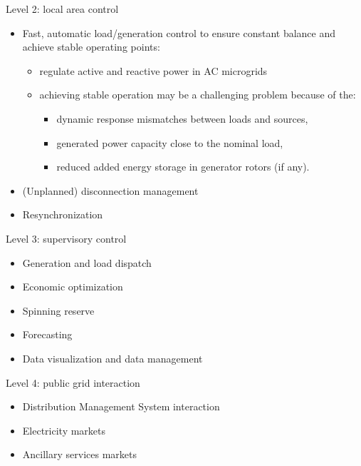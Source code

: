 \begin{frame}{Level 2: local area control}
\begin{itemize}
\item Fast, automatic load/generation control to ensure constant balance and
  achieve stable operating points:
  \begin{itemize}
  \item regulate active and reactive power in AC microgrids
  \item achieving stable operation may be a challenging problem because of the:
    \begin{itemize}
    \item dynamic response mismatches between loads and sources,
    \item generated power capacity close to the nominal load,
    \item reduced added energy storage in generator rotors (if any).
    \end{itemize}
  \end{itemize}
\item (Unplanned) disconnection management
\item Resynchronization
\end{itemize}
\end{frame}

\begin{frame}{Level 3: supervisory control}
\begin{itemize}
\item Generation and load dispatch
\item Economic optimization
\item Spinning reserve
\item Forecasting
\item Data visualization and data management
\end{itemize}
\end{frame}

\begin{frame}{Level 4: public grid interaction}

\begin{itemize}
\item Distribution Management System interaction
\item Electricity markets
\item Ancillary services markets
\end{itemize}
\end{frame}

%  
%  
